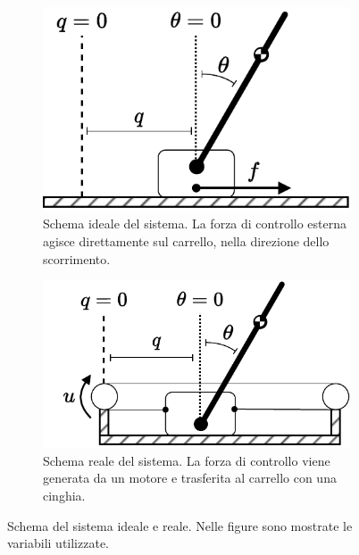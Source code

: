 \begin{figure}
    \centering
    \begin{subfigure}[b]{0.4\textwidth}
        \centering
        \includegraphics[width=\textwidth]{assets/pic}
        \caption{Schema ideale del sistema. La forza di controllo esterna
        agisce direttamente sul carrello, nella direzione dello scorrimento.}
        \label{fig:pic}
    \end{subfigure}
    \hfill
    \begin{subfigure}[b]{0.48\textwidth}
        \centering
        \includegraphics[width=\textwidth]{assets/pic-real}
        \caption{Schema reale del sistema. La forza di controllo viene
        generata da un motore e trasferita al carrello con una cinghia.}
        \label{fig:pic-real}
    \end{subfigure}
    \caption{Schema del sistema ideale e reale. Nelle figure sono mostrate le variabili
    utilizzate.}
\end{figure}
